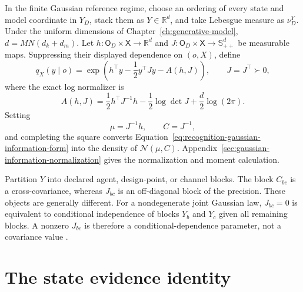 In the finite Gaussian reference regime, choose an ordering of every state and model coordinate in \(Y_D\), stack them as \(Y\in\mathbb R^d\), and take Lebesgue measure as \(\nu_D^Y\). Under the uniform dimensions of Chapter~\ref{ch:generative-model}, \(d=MN(d_k+d_m)\). Let \(h:\mathsf O_D\times\mathsf X\to\mathbb R^d\) and \(J:\mathsf O_D\times\mathsf X\to\mathbb S_{++}^d\) be measurable maps. Suppressing their displayed dependence on \((o,X)\), define
\begin{equation}
q_X(y\mid o)
=\exp\left(
h^\top y-\frac12y^\top Jy-A(h,J)
\right),
\qquad
J=J^\top\succ0,
\label{eq:recognition-gaussian-information-form}
\end{equation}
where the exact log normalizer is
\begin{equation}
A(h,J)
=\frac12h^\top J^{-1}h
-\frac12\log\det J
+\frac d2\log(2\pi).
\label{eq:recognition-gaussian-log-normalizer}
\end{equation}
Setting
\begin{equation}
\mu=J^{-1}h,
\qquad
C=J^{-1},
\label{eq:recognition-gaussian-moments}
\end{equation}
and completing the square converts Equation~\eqref{eq:recognition-gaussian-information-form} into the density of \(\mathcal N(\mu,C)\). Appendix~\ref{sec:gaussian-information-normalization} gives the normalization and moment calculation.

Partition \(Y\) into declared agent, design-point, or channel blocks. The block \(C_{bc}\) is a cross-covariance, whereas \(J_{bc}\) is an off-diagonal block of the precision. These objects are generally different. For a nondegenerate joint Gaussian law, \(J_{bc}=0\) is equivalent to conditional independence of blocks \(Y_b\) and \(Y_c\) given all remaining blocks. A nonzero \(J_{bc}\) is therefore a conditional-dependence parameter, not a covariance value \citep{Lauritzen1996,Wainwright2008}.

\section{The state evidence identity}

